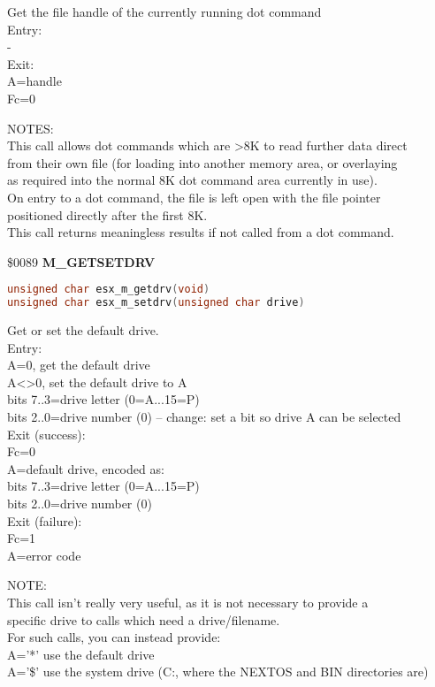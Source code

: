 Get the file handle of the currently running dot command\\
Entry:\\
-\\
Exit:\\
A=handle\\
Fc=0

NOTES:\\
This call allows dot commands which are >8K to read further data direct\\
from their own file (for loading into another memory area, or overlaying\\
as required into the normal 8K dot command area currently in use).\\
On entry to a dot command, the file is left open with the file pointer\\
positioned directly after the first 8K.\\
This call returns meaningless results if not called from a dot command.

\$0089 \textbf{M\_GETSETDRV}

\begin{lstlisting}[language=C]
unsigned char esx_m_getdrv(void)
unsigned char esx_m_setdrv(unsigned char drive)
\end{lstlisting}

Get or set the default drive.\\
Entry:\\
A=0, get the default drive\\
A<>0, set the default drive to A\\
bits 7..3=drive letter (0=A...15=P)\\
bits 2..0=drive number (0) -- change: set a bit so drive A can be selected\\
Exit (success):\\
Fc=0\\
A=default drive, encoded as:\\
bits 7..3=drive letter (0=A...15=P)\\
bits 2..0=drive number (0)\\
Exit (failure):\\
Fc=1\\
A=error code

NOTE:\\
This call isn't really very useful, as it is not necessary to provide a\\
specific drive to calls which need a drive/filename.\\
For such calls, you can instead provide:\\
A='*' use the default drive\\
A='\$' use the system drive (C:, where the NEXTOS and BIN directories are)

